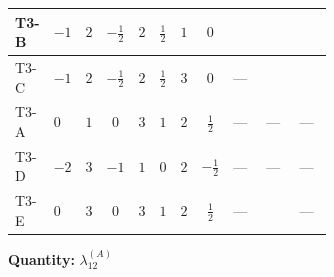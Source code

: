 \documentclass[8pt]{article}
\begin{document}
\begin{landscape}
\begin{longtable}{@{}llcccccc >{\raggedright\arraybackslash}p{0.21\linewidth} >{\raggedright\arraybackslash}p{0.21\linewidth} >{\raggedright\arraybackslash}p{0.21\linewidth}@{}}
T3-B & $-1$ & $2$ & $-\frac{1}{2}$ & $2$ & $\frac{1}{2}$ & $1$ & $0$ & \scriptsize\adjustbox{max width=\linewidth}{$\begin{gathered} +\frac{2}{3} (\left({\lambda_{10}}\right)^{*}+\left({\lambda_{11}}\right)^{*}) \operatorname{Tr}\!\left({y_2}\,\left({y_1}\right)^{\dagger}\right)\end{gathered}$} & \scriptsize\adjustbox{max width=\linewidth}{$\begin{gathered} -\frac{8}{3} \operatorname{Tr}\!\left({y_1}\,\left({y_1}\right)^{\dagger}\,{y_2}\,\left({y_2}\right)^{\dagger}\right)\end{gathered}$} & \scriptsize\adjustbox{max width=\linewidth}{$\begin{gathered} +\frac{64}{3} {\lambda_9} \left({\lambda_9}\right)^{*}\end{gathered}$} \\
\midrule
T3-C & $-1$ & $2$ & $-\frac{1}{2}$ & $2$ & $\frac{1}{2}$ & $3$ & $0$ & --- & \scriptsize\adjustbox{max width=\linewidth}{$\begin{gathered} -\frac{2}{3} \operatorname{Tr}\!\left({y_1}\,\left({y_1}\right)^{\dagger}\,{y_2}\,\left({y_2}\right)^{\dagger}\right)\end{gathered}$} & \scriptsize\adjustbox{max width=\linewidth}{$\begin{gathered} +\frac{64}{3} {\lambda_9} \left({\lambda_9}\right)^{*}\end{gathered}$} \\
\midrule
T3-A & $0$ & $1$ & $0$ & $3$ & $1$ & $2$ & $\frac{1}{2}$ & --- & --- & --- \\
\midrule
T3-D & $-2$ & $3$ & $-1$ & $1$ & $0$ & $2$ & $-\frac{1}{2}$ & --- & --- & --- \\
\midrule
T3-E & $0$ & $3$ & $0$ & $3$ & $1$ & $2$ & $\frac{1}{2}$ & --- & \scriptsize\adjustbox{max width=\linewidth}{$\begin{gathered} +\frac{2}{3} \operatorname{Tr}\!\left({y_1}\,\left({y_1}\right)^{\dagger}\,{y_2}\,\left({y_2}\right)^{\dagger}\right)\end{gathered}$} & --- \\
\midrule
\bottomrule
\end{longtable}
\clearpage
\noindent\textbf{Quantity: }$\lambda_{12}^{(A)}$\par\smallskip

\end{landscape}
\end{document}
